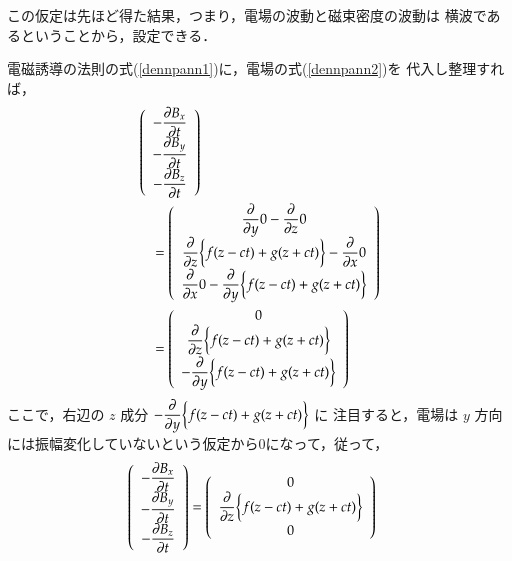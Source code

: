         この仮定は先ほど得た結果，つまり，電場の波動と磁束密度の波動は
        横波であるということから，設定できる．

        電磁誘導の法則の式(\ref{dennpann1})に，電場の式(\ref{dennpann2})を
        代入し整理すれば，
        \begin{align*}
        &\left(
        \begin{array}{cc}
        -\displaystyle\frac{\partial B_{x}}{\partial t} \\
        -\displaystyle\frac{\partial B_{y}}{\partial t} \\
        -\displaystyle\frac{\partial B_{z}}{\partial t}
        \end{array}
        \right)  \notag \\
        &\quad =
        \left(
        \begin{array}{cc}
        \displaystyle\frac{\partial }{\partial y}0-\frac{\partial }{\partial z}0\\
        \displaystyle\frac{\partial }{\partial z}\biggl\{f(z-ct) +g(z+ct)\biggr\}-\frac{\partial }{\partial x}0 \\
        \displaystyle\frac{\partial }{\partial x}0-\frac{\partial }{\partial y}\biggl\{f(z-ct) +g(z+ct)\biggr\}
        \end{array}
        \right) \notag \\
        &\quad =
        \left(
        \begin{array}{cc}
        0\\
        \displaystyle\frac{\partial }{\partial z}\biggl\{f(z-ct) +g(z+ct)\biggr\} \\
        -\displaystyle\frac{\partial }{\partial y}\biggl\{f(z-ct) +g(z+ct)\biggr\}
        \end{array}
        \right)
        \end{align*}
        ここで，右辺の $z$ 成分 $-\displaystyle\frac{\partial }{\partial y}\biggl\{f(z-ct) +g(z+ct)\biggr\}$ に
        注目すると，電場は $y$ 方向には振幅変化していないという仮定から0になって，従って，
        \begin{align*}
        \left(
        \begin{array}{cc}
        -\displaystyle\frac{\partial B_{x}}{\partial t} \\
        -\displaystyle\frac{\partial B_{y}}{\partial t} \\
        -\displaystyle\frac{\partial B_{z}}{\partial t}
        \end{array}
        \right)
        &=
        \left(
        \begin{array}{cc}
        0\\
        \displaystyle\frac{\partial }{\partial z}\biggl\{f(z-ct) +g(z+ct)\biggr\} \\
        0
        \end{array}
        \right)
        \end{align*}
